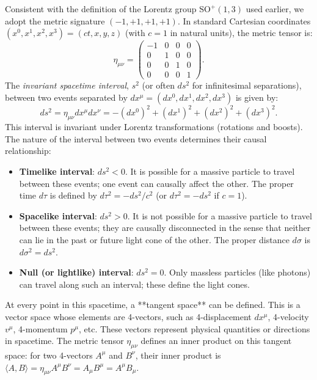 \documentclass{amsart}
\theoremstyle{definition}
\theoremstyle{remark}
\begin{document}
Consistent with the definition of the Lorentz group $\mathrm{SO}^+(1,3)$ used earlier, we adopt the metric signature $(-1, +1, +1, +1)$. In standard Cartesian coordinates $(x^0, x^1, x^2, x^3) = (ct, x, y, z)$ (with $c=1$ in natural units), the metric tensor is:
\begin{equation*}
  \eta_{\mu\nu} = \begin{pmatrix} -1 & 0 & 0 & 0 \\ 0 & 1 & 0 & 0 \\ 0 & 0 & 1 & 0 \\ 0 & 0 & 0 & 1 \end{pmatrix}.
\end{equation*}
The \emph{invariant spacetime interval}, $s^2$ (or often $ds^2$ for infinitesimal separations), between two events separated by $dx^\mu = (dx^0, dx^1, dx^2, dx^3)$ is given by:
\begin{equation*}
  ds^2 = \eta_{\mu\nu} dx^\mu dx^\nu = -(dx^0)^2 + (dx^1)^2 + (dx^2)^2 + (dx^3)^2.
\end{equation*}
This interval is invariant under Lorentz transformations (rotations and boosts). The nature of the interval between two events determines their causal relationship:
\begin{itemize}
    \item \textbf{Timelike interval}: $ds^2 < 0$. It is possible for a massive particle to travel between these events; one event can causally affect the other. The proper time $d\tau$ is defined by $d\tau^2 = -ds^2/c^2$ (or $d\tau^2 = -ds^2$ if $c=1$).
    \item \textbf{Spacelike interval}: $ds^2 > 0$. It is not possible for a massive particle to travel between these events; they are causally disconnected in the sense that neither can lie in the past or future light cone of the other. The proper distance $d\sigma$ is $d\sigma^2 = ds^2$.
    \item \textbf{Null (or lightlike) interval}: $ds^2 = 0$. Only massless particles (like photons) can travel along such an interval; these define the light cones.
\end{itemize}

At every point in this spacetime, a **tangent space** can be defined. This is a vector space whose elements are 4-vectors, such as 4-displacement $dx^\mu$, 4-velocity $v^\mu$, 4-momentum $p^\mu$, etc. These vectors represent physical quantities or directions in spacetime. The metric tensor $\eta_{\mu\nu}$ defines an inner product on this tangent space: for two 4-vectors $A^\mu$ and $B^\nu$, their inner product is $\langle A, B \rangle = \eta_{\mu\nu} A^\mu B^\nu = A_\mu B^\mu = A^\mu B_\mu$.
\end{document}
